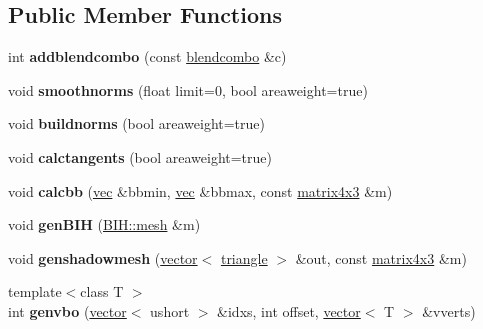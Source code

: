 \subsection*{Public Member Functions}
\begin{DoxyCompactItemize}
\item 
\mbox{\label{structskelmodel_1_1skelmesh_ae086745201fed9e60308de9fc49e967a}} 
int {\bfseries addblendcombo} (const \hyperlink{structskelmodel_1_1blendcombo}{blendcombo} \&c)
\item 
\mbox{\label{structskelmodel_1_1skelmesh_ab45bc9d5bb53be4b270916dc47807e06}} 
void {\bfseries smoothnorms} (float limit=0, bool areaweight=true)
\item 
\mbox{\label{structskelmodel_1_1skelmesh_a4dbaa8d6b6a7240ed53f31c3155842f1}} 
void {\bfseries buildnorms} (bool areaweight=true)
\item 
\mbox{\label{structskelmodel_1_1skelmesh_aaf4c61da796a07b19f1234fa752d434d}} 
void {\bfseries calctangents} (bool areaweight=true)
\item 
\mbox{\label{structskelmodel_1_1skelmesh_a524cba3c33a1c2781f511ac7f59d0959}} 
void {\bfseries calcbb} (\hyperlink{structvec}{vec} \&bbmin, \hyperlink{structvec}{vec} \&bbmax, const \hyperlink{structmatrix4x3}{matrix4x3} \&m)
\item 
\mbox{\label{structskelmodel_1_1skelmesh_aafc01491badf8d89c38a58caea9d4f6d}} 
void {\bfseries gen\+B\+IH} (\hyperlink{struct_b_i_h_1_1mesh}{B\+I\+H\+::mesh} \&m)
\item 
\mbox{\label{structskelmodel_1_1skelmesh_a2fd87b73add13e69e1342695f24d9a18}} 
void {\bfseries genshadowmesh} (\hyperlink{structvector}{vector}$<$ \hyperlink{structtriangle}{triangle} $>$ \&out, const \hyperlink{structmatrix4x3}{matrix4x3} \&m)
\item 
\mbox{\label{structskelmodel_1_1skelmesh_a783cb6a75b4881c5dba6858faf6fdc87}} 
{\footnotesize template$<$class T $>$ }\\int {\bfseries genvbo} (\hyperlink{structvector}{vector}$<$ ushort $>$ \&idxs, int offset, \hyperlink{structvector}{vector}$<$ T $>$ \&vverts)

\end{DoxyCompactItemize}
